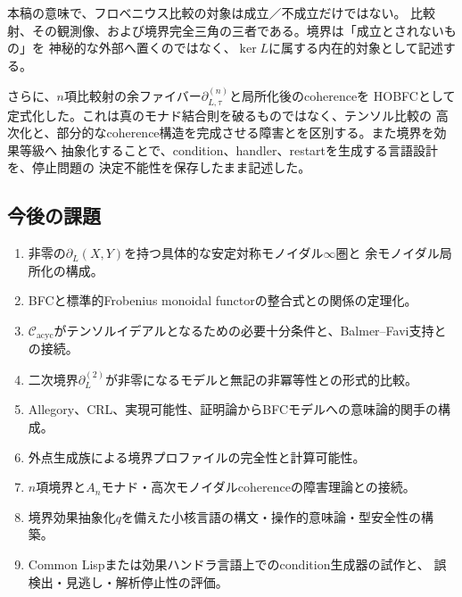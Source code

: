 \documentclass[11pt,a4paper]{ltjsarticle}
\theoremstyle{definition}
\theoremstyle{remark}
\newcommand{\Cacyc}{\mathcal{C}_{\mathrm{acyc}}}
\newcommand{\Boundary}{\partial_L}
\begin{document}
本稿の意味で、フロベニウス比較の対象は成立／不成立だけではない。
比較射、その観測像、および境界完全三角の三者である。境界は「成立とされないもの」を
神秘的な外部へ置くのではなく、$\ker L$に属する内在的対象として記述する。

さらに、$n$項比較射の余ファイバー$\partial_{L,\tau}^{(n)}$と局所化後のcoherenceを
HOBFCとして定式化した。これは真のモナド結合則を破るものではなく、テンソル比較の
高次化と、部分的なcoherence構造を完成させる障害とを区別する。また境界を効果等級へ
抽象化することで、condition、handler、restartを生成する言語設計を、停止問題の
決定不能性を保存したまま記述した。

\subsection{今後の課題}

\begin{enumerate}
 \item 非零の$\Boundary(X,Y)$を持つ具体的な安定対称モノイダル$\infty$圏と
 余モノイダル局所化の構成。
 \item BFCと標準的Frobenius monoidal functorの整合式との関係の定理化。
 \item $\Cacyc$がテンソルイデアルとなるための必要十分条件と、Balmer--Favi支持との接続。
 \item 二次境界$\Boundary^{(2)}$が非零になるモデルと無記の非冪等性との形式的比較。
 \item Allegory、CRL、実現可能性、証明論からBFCモデルへの意味論的関手の構成。
 \item 外点生成族による境界プロファイルの完全性と計算可能性。
 \item $n$項境界と$A_n$モナド・高次モノイダルcoherenceの障害理論との接続。
 \item 境界効果抽象化$q$を備えた小核言語の構文・操作的意味論・型安全性の構築。
 \item Common Lispまたは効果ハンドラ言語上でのcondition生成器の試作と、
 誤検出・見逃し・解析停止性の評価。
\end{enumerate}
\end{document}
